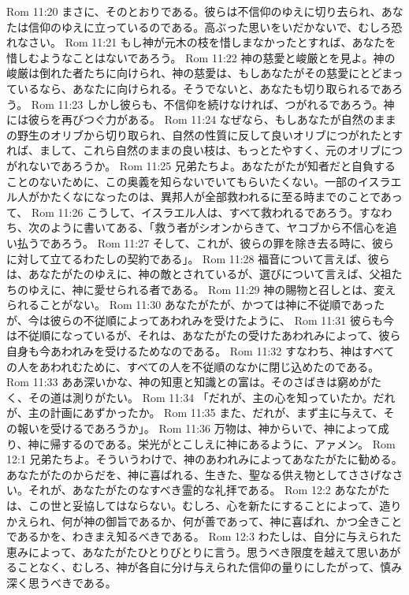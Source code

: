 Rom 11:20  まさに、そのとおりである。彼らは不信仰のゆえに切り去られ、あなたは信仰のゆえに立っているのである。高ぶった思いをいだかないで、むしろ恐れなさい。
Rom 11:21  もし神が元木の枝を惜しまなかったとすれば、あなたを惜しむようなことはないであろう。
Rom 11:22  神の慈愛と峻厳とを見よ。神の峻厳は倒れた者たちに向けられ、神の慈愛は、もしあなたがその慈愛にとどまっているなら、あなたに向けられる。そうでないと、あなたも切り取られるであろう。
Rom 11:23  しかし彼らも、不信仰を続けなければ、つがれるであろう。神には彼らを再びつぐ力がある。
Rom 11:24  なぜなら、もしあなたが自然のままの野生のオリブから切り取られ、自然の性質に反して良いオリブにつがれたとすれば、まして、これら自然のままの良い枝は、もっとたやすく、元のオリブにつがれないであろうか。
Rom 11:25  兄弟たちよ。あなたがたが知者だと自負することのないために、この奥義を知らないでいてもらいたくない。一部のイスラエル人がかたくなになったのは、異邦人が全部救われるに至る時までのことであって、
Rom 11:26  こうして、イスラエル人は、すべて救われるであろう。すなわち、次のように書いてある、「救う者がシオンからきて、ヤコブから不信心を追い払うであろう。
Rom 11:27  そして、これが、彼らの罪を除き去る時に、彼らに対して立てるわたしの契約である」。
Rom 11:28  福音について言えば、彼らは、あなたがたのゆえに、神の敵とされているが、選びについて言えば、父祖たちのゆえに、神に愛せられる者である。
Rom 11:29  神の賜物と召しとは、変えられることがない。
Rom 11:30  あなたがたが、かつては神に不従順であったが、今は彼らの不従順によってあわれみを受けたように、
Rom 11:31  彼らも今は不従順になっているが、それは、あなたがたの受けたあわれみによって、彼ら自身も今あわれみを受けるためなのである。
Rom 11:32  すなわち、神はすべての人をあわれむために、すべての人を不従順のなかに閉じ込めたのである。
Rom 11:33  ああ深いかな、神の知恵と知識との富は。そのさばきは窮めがたく、その道は測りがたい。
Rom 11:34  「だれが、主の心を知っていたか。だれが、主の計画にあずかったか。
Rom 11:35  また、だれが、まず主に与えて、その報いを受けるであろうか」。
Rom 11:36  万物は、神からいで、神によって成り、神に帰するのである。栄光がとこしえに神にあるように、アァメン。
Rom 12:1  兄弟たちよ。そういうわけで、神のあわれみによってあなたがたに勧める。あなたがたのからだを、神に喜ばれる、生きた、聖なる供え物としてささげなさい。それが、あなたがたのなすべき霊的な礼拝である。
Rom 12:2  あなたがたは、この世と妥協してはならない。むしろ、心を新たにすることによって、造りかえられ、何が神の御旨であるか、何が善であって、神に喜ばれ、かつ全きことであるかを、わきまえ知るべきである。
Rom 12:3  わたしは、自分に与えられた恵みによって、あなたがたひとりびとりに言う。思うべき限度を越えて思いあがることなく、むしろ、神が各自に分け与えられた信仰の量りにしたがって、慎み深く思うべきである。
